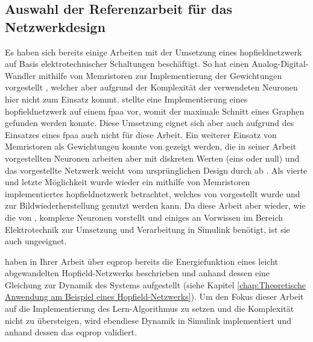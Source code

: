 \subsection{Auswahl der Referenzarbeit für das Netzwerkdesign}
\label{chap:Auswahl der Referenzarbeit für das Netzwerkdesign}

Es haben sich bereits einige Arbeiten mit der Umsetzung eines \gls{hopfieldnetzwerk} auf Basis elektrotechnischer Schaltungen beschäftigt. So hat \zb \citeauthor{Guo2015} einen Analog-Digital-Wandler mithilfe von Memristoren zur Implementierung der Gewichtungen vorgestellt \cite{Guo2015}, welcher aber aufgrund der Komplexität der verwendeten Neuronen hier nicht zum Einsatz kommt. \citeauthor{Mathews2023} stellte \citeyear{Mathews2023} eine Implementierung eines \gls{hopfieldnetzwerk} auf einem \gls{fpaa} vor, womit der maximale Schnitt eines Graphen gefunden werden konnte. Diese Umsetzung eignet sich aber auch aufgrund des Einsatzes eines \gls{fpaa} auch nicht für diese Arbeit. Ein weiterer Einsatz von Memristoren als Gewichtungen konnte von \citeauthor{Hu2015} gezeigt werden, die in seiner Arbeit vorgestellten Neuronen arbeiten aber mit diskreten Werten (eins oder null) und das vorgestellte Netzwerk weicht vom ursprünglichen Design durch \citeauthor{Hopfield1982} ab \cite{Hu2015}. Als vierte und letzte Möglichkeit wurde wieder ein mithilfe von Memristoren implementiertes \gls{hopfieldnetzwerk} betrachtet, welches \citeyear{Hong2020} von \citeauthor{Hong2020} vorgestellt wurde und zur Bildwiederherstellung genutzt werden kann. Da diese Arbeit aber wieder, wie die von \cite{Guo2015}, komplexe Neuronen vorstellt und einiges an Vorwissen im Bereich Elektrotechnik zur Umsetzung und Verarbeitung in Simulink benötigt, ist sie auch ungeeignet.

\citeauthor{Scellier2017} haben in Ihrer Arbeit über \gls{eqprop} bereits die Energiefunktion eines leicht abgewandelten Hopfield-Netzwerks beschrieben und anhand dessen eine Gleichung zur Dynamik des Systems aufgestellt (siehe Kapitel \ref{chap:Theoretische Anwendung am Beispiel eines Hopfield-Netzwerks}). Um den Fokus dieser Arbeit auf die Implementierung des Lern-Algorithmus zu setzen und die Komplexität nicht zu übersteigen, wird ebendiese Dynamik in Simulink implementiert und anhand dessen das \gls{eqprop} validiert.
